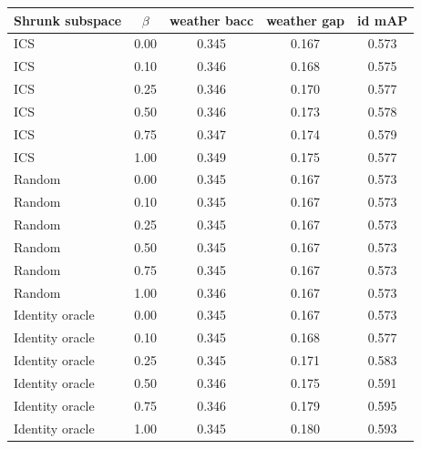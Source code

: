 \begin{tabular}{lcccc}
\toprule
Shrunk subspace & $\beta$ & weather bacc & weather gap & id mAP \\
\midrule
ICS & 0.00 & 0.345 & 0.167 & 0.573 \\
ICS & 0.10 & 0.346 & 0.168 & 0.575 \\
ICS & 0.25 & 0.346 & 0.170 & 0.577 \\
ICS & 0.50 & 0.346 & 0.173 & 0.578 \\
ICS & 0.75 & 0.347 & 0.174 & 0.579 \\
ICS & 1.00 & 0.349 & 0.175 & 0.577 \\
Random & 0.00 & 0.345 & 0.167 & 0.573 \\
Random & 0.10 & 0.345 & 0.167 & 0.573 \\
Random & 0.25 & 0.345 & 0.167 & 0.573 \\
Random & 0.50 & 0.345 & 0.167 & 0.573 \\
Random & 0.75 & 0.345 & 0.167 & 0.573 \\
Random & 1.00 & 0.346 & 0.167 & 0.573 \\
Identity oracle & 0.00 & 0.345 & 0.167 & 0.573 \\
Identity oracle & 0.10 & 0.345 & 0.168 & 0.577 \\
Identity oracle & 0.25 & 0.345 & 0.171 & 0.583 \\
Identity oracle & 0.50 & 0.346 & 0.175 & 0.591 \\
Identity oracle & 0.75 & 0.346 & 0.179 & 0.595 \\
Identity oracle & 1.00 & 0.345 & 0.180 & 0.593 \\
\bottomrule
\end{tabular}

